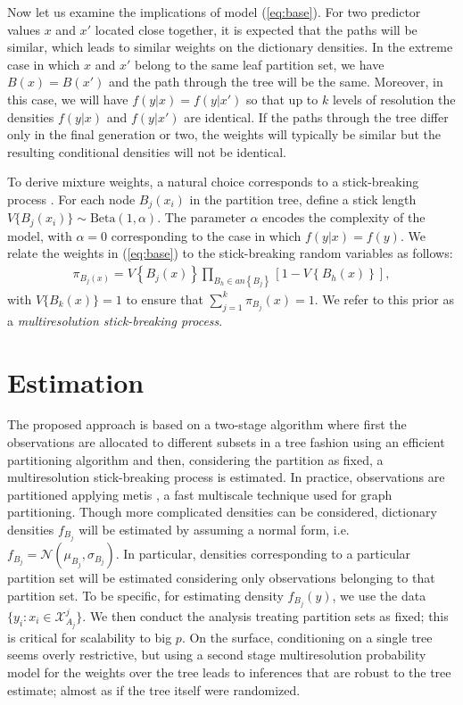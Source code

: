 \documentclass{article} %
\providecommand{\mc}[1]{\mathcal{#1}}
\begin{document}
Now let us examine the implications of model (\ref{eq:base}). For two predictor values $x$ and $x'$ located close together, it is expected that the paths will be similar, which leads to similar weights on the dictionary densities.  In the extreme case in which $x$ and $x'$ belong to the same leaf partition set, we have $B(x) = B(x')$ and the path through the tree will be the same.  Moreover, in this case, we will have $f(y|x)=f(y|x')$ so that up to $k$ levels of resolution the densities $f(y|x)$ and $f(y|x')$ are identical.  If the paths through the tree differ only in the final generation or two, the weights will typically be similar but the resulting conditional densities will not be identical. 

To derive mixture weights, a natural choice corresponds to a stick-breaking process \cite{stickbreaking}.  For each node $B_j(x_i)$ in the partition tree, define a stick length $V\{B_j(x_i)\} \sim \mbox{Beta}(1,\alpha)$.  The parameter $\alpha$ encodes the complexity of the model, with $\alpha=0$ corresponding to the case in which $f(y|x) = f(y)$.  We relate the weights in (\ref{eq:base}) to the stick-breaking random variables as follows: 
\begin{eqnarray*}
\pi_{B_j(x)} = V\left\{B_j(x)\right\} \prod_{B_h \in an\left\{B_j\right\}} \left[1 - V\left\{B_h(x)\right\}\right],
\end{eqnarray*}
with $V\{B_k(x)\}=1$ to ensure that $\sum_{j=1}^k \pi_{B_j}(x) = 1$.   We refer to this prior as a {\em multiresolution stick-breaking process}.   
\vskip 12pt


\section{Estimation}

The proposed approach is based on a two-stage algorithm where first the observations are allocated to different subsets in a tree fashion using an efficient partitioning algorithm and then, considering the partition as fixed, a multiresolution stick-breaking process is estimated. In practice, observations are partitioned applying metis \cite{metis}, a fast multiscale technique used for graph partitioning. 
Though more complicated densities can be considered, dictionary densities $f_{B_j}$ will be estimated by assuming a normal form, i.e. $f_{B_j}=\mc{N}(\mu_{B_j},\sigma_{B_j})$. In particular, densities corresponding to a particular partition set will be estimated considering only observations belonging to that partition set. To be specific, for estimating density $f_{B_j}(y)$, we use the data $\{ y_i: x_i \in \mathcal{X}^j_{A_j} \}$. We then conduct the analysis treating partition sets as fixed; this is critical for scalability to big $p$.  On the surface, conditioning on a single tree seems overly restrictive, but using a second stage multiresolution probability model for the weights over the tree leads to inferences that are robust to the tree estimate; almost as if the tree itself were randomized.
\end{document}
